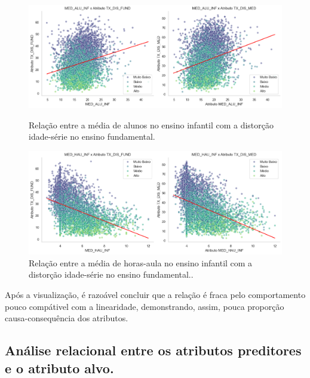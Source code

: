 \begin{figure}[H]
    \centering
    \begin{minipage}{0.45\textwidth}
        \centering
        \includegraphics[scale=0.25]{Graphics/DispersaoInfantilAlunosDistorcao.png}
        \caption{Relação entre a média de alunos no ensino infantil com a distorção idade-série no ensino fundamental.}
        \label{fig:disp-inf-fund}
    \end{minipage}\hfill
    \begin{minipage}{0.45\textwidth}
        \centering
        \includegraphics[scale=0.25]{Graphics/DispersaoInfantilHorasDistorcao.png}
        \caption{Relação entre a média de horas-aula no ensino infantil com a distorção idade-série no ensino fundamental..}
        \label{fig:dis-inf-med}
    \end{minipage}
\end{figure}

\par Após a visualização, é razoável concluir que a relação é fraca pelo comportamento pouco compátivel com a linearidade, demonstrando, assim, pouca proporção causa-consequência dos atributos.

\subsection{Análise relacional entre os atributos preditores e o atributo alvo.}

